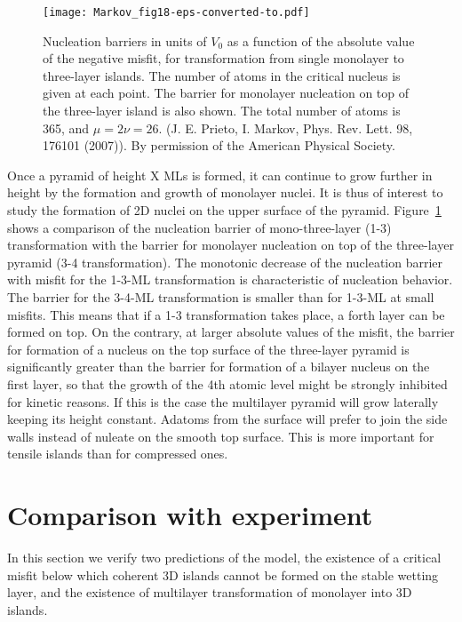 \documentclass[aps,prl,showpacs,twocolumn,byrevtex,floatfix]{revtex4-1}
\begin{document}
\begin{figure}[htb]
\texttt{[image: Markov\_fig18-eps-converted-to.pdf]}
\caption{\label{multimono} Nucleation barriers in units of $V_0$ as a function
of the absolute value of the negative misfit, for transformation from
single monolayer to three-layer islands. The number of atoms in the critical
nucleus is given at each point. The barrier for monolayer nucleation on top of
the three-layer island is also shown. The total number of atoms is 365, and $\mu
= 2\nu = 26$. (J. E. Prieto, I. Markov, Phys. Rev. Lett. 98, 176101 (2007)). By
permission of the American Physical Society.}
\end{figure}


Once a pyramid of height X MLs is formed, it can continue to grow further in
height by the formation and growth of monolayer nuclei. It is thus of interest 
to
study the formation of 2D nuclei on the upper surface of the pyramid. Figure\
\ref{multimono} shows a comparison of the nucleation barrier of mono-three-layer
(1-3) transformation with the barrier for monolayer nucleation on top of the
three-layer pyramid (3-4 transformation). The monotonic decrease of the
nucleation barrier with misfit for the 1-3-ML transformation is characteristic
of nucleation behavior.\cite{Prieto05} The barrier for the 3-4-ML transformation
is smaller than for 1-3-ML at small misfits. This means that if a 1-3
transformation takes place, a forth layer can be formed on top. On the contrary,
at larger absolute values of the misfit, the barrier for formation of a nucleus
on the top surface of the three-layer pyramid is significantly greater than the
barrier for formation of a bilayer nucleus on the first layer, so that the
growth of the 4th atomic level might be strongly inhibited for kinetic reasons.
If this is the case the multilayer pyramid will grow laterally keeping its
height constant. Adatoms from the surface will prefer to join the side walls
instead of nuleate on the smooth top surface. This is more important for 
tensile islands than for compressed ones.

\section{Comparison with experiment}

In this section we verify two predictions of the model, the existence of a
critical misfit below which coherent 3D islands cannot be formed on the stable
wetting layer, and the existence of multilayer transformation of monolayer into
3D islands.
\end{document}

